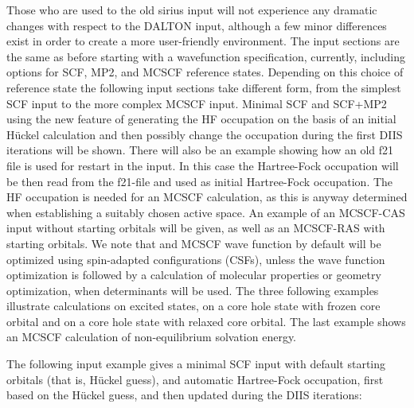 Those who are used to the old {\sc sirius} input will not
experience any dramatic changes with respect to the DALTON input,
although a few minor differences exist in order to create a more
user-friendly environment. The input sections are the same as
before starting with a wavefunction specification, currently,
including options for SCF, MP2, and MCSCF reference states.
Depending on this choice of reference state the following input
sections take different form, from the simplest SCF input to the
more complex MCSCF input. Minimal SCF and SCF+MP2
 using the new feature of generating the HF
occupation on the basis of an initial H\"{u}ckel
calculation and then possibly change the
occupation during the first DIIS iterations will be
shown. There will also be an example showing how an old f21 file
is used for restart in the input. 
In this case the Hartree-Fock occupation will be then read from
the f21-file and used as initial Hartree-Fock occupation. The HF occupation is
needed for an MCSCF calculation, as this is anyway
determined when establishing a suitably chosen active
space. An example of an
MCSCF-CAS input without starting
orbitals will be given, as well as an
MCSCF-RAS with starting orbitals. We note that and
MCSCF wave function by default will be optimized using
spin-adapted configurations (CSFs), unless the wave function optimization is followed
by a calculation of molecular properties or geometry optimization,
when determinants will be used. The three
following examples illustrate calculations on excited
states, on a core hole state
with frozen core orbital and on a core hole
state with relaxed core orbital. The last
example shows an MCSCF calculation of non-equilibrium solvation
energy.

\bigskip

The following input example gives a minimal
SCF input with default
starting  orbitals (that is, H\"{u}ckel guess), and automatic Hartree-Fock
occupation, first based on the H\"{u}ckel guess, and
then updated during the DIIS iterations:

